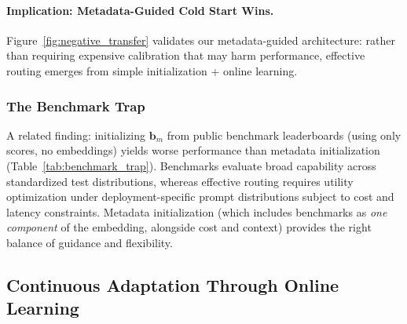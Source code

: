 \paragraph{Implication: Metadata-Guided Cold Start Wins.} Figure~\ref{fig:negative_transfer} validates our metadata-guided architecture: rather than requiring expensive calibration that may harm performance, effective routing emerges from simple initialization + online learning.

\subsubsection{The Benchmark Trap}
\label{sec:benchmark_trap}
A related finding: initializing $\mathbf{b}_m$ from public benchmark leaderboards (using only scores, no embeddings) yields worse performance than metadata initialization (Table~\ref{tab:benchmark_trap}). Benchmarks evaluate broad capability across standardized test distributions, whereas effective routing requires utility optimization under deployment-specific prompt distributions subject to cost and latency constraints. Metadata initialization (which includes benchmarks as \emph{one component} of the embedding, alongside cost and context) provides the right balance of guidance and flexibility.

\begin{table}[t]
\centering
\small
\caption{\textbf{The Benchmark Trap.} Benchmark-only initialization hurts; metadata embedding helps.}
\label{tab:benchmark_trap}
\end{table}


\subsection{Continuous Adaptation Through Online Learning}
\label{sec:rq2}

